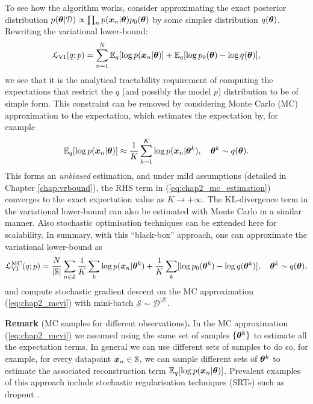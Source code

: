 To see how the algorithm works, consider approximating the exact posterior distribution $p(\bm{\theta} | \mathcal{D}) \propto \prod_n p(\bm{x}_n |\bm{\theta}) p_0(\bm{\theta})$ by some simpler distribution $q(\bm{\theta})$. Rewriting the variational lower-bound:
\begin{equation}
\mathcal{L}_{\text{VI}}(q; p) = \sum_{n=1}^N \mathbb{E}_q [\log p(\bm{x}_n | \bm{\theta})] + \mathbb{E}_q[\log p_0(\bm{\theta}) - \log q(\bm{\theta}) ],
\end{equation}
we see that it is the analytical tractability requirement of computing the expectations that restrict the $q$ (and possibly the model $p$) distribution to be of simple form. This constraint can be removed by considering Monte Carlo (MC) approximation to the expectation, which estimates the expectation by, for example
\begin{equation}
\mathbb{E}_{q}[\log p(\bm{x}_n|\bm{\theta} )] \approx \frac{1}{K} \sum_{k=1}^K \log p(\bm{x}_n |\bm{\theta}^k ), \quad \bm{\theta}^k \sim q(\bm{\theta}).
\label{eq:chap2_mc_estimation}
\end{equation}
This forms an \emph{unbiased} estimation, and under mild assumptions (detailed in Chapter \ref{chap:vrbound}), the RHS term in (\ref{eq:chap2_mc_estimation}) converges to the exact expectation value as $K \rightarrow +\infty$. The KL-divergence term in the variational lower-bound can also be estimated with Monte Carlo in a similar manner. Also stochastic optimisation techniques can be extended here for scalability. In summary, with this ``black-box'' approach, one can approximate the variational lower-bound as
\begin{equation}
\mathcal{L}^{\text{MC}}_{\text{VI}}(q; p) = \frac{N}{|\mathcal{S}|} \sum_{n \in \mathcal{S}} \frac{1}{K} \sum_{k} \log p(\bm{x}_n | \bm{\theta}^k) + \frac{1}{K} \sum_{k} [\log p_0(\bm{\theta}^k) - \log q(\bm{\theta}^k) ], \quad \bm{\theta}^k \sim q(\bm{\theta}),
\label{eq:chap2_mcvi}
\end{equation}
and compute stochastic gradient descent on the MC approximation (\ref{eq:chap2_mcvi}) with mini-batch $\mathcal{S} \sim \mathcal{D}^{|\mathcal{S}|}$.

\vspace{1em}
\begin{tcolorbox}
\textbf{Remark} (MC samples for different observations)\textbf{.}
In the MC approximation (\ref{eq:chap2_mcvi}) we assumed using the same set of samples $\{ \bm{\theta}^k \}$ to estimate all the expectation terms. In general we can use different sets of samples to do so, for example, for every datapoint $\bm{x}_n \in \mathcal{S}$, we can sample different sets of $\bm{\theta}^k$ to estimate the associated reconstruction term $\mathbb{E}_{q}[\log p(\bm{x}_n | \bm{\theta})]$. Prevalent examples of this approach include stochastic regularisation techniques (SRTs) such as dropout \citep{srivastava:dropout2014, gal:uncertainty2016}.

\end{tcolorbox}


